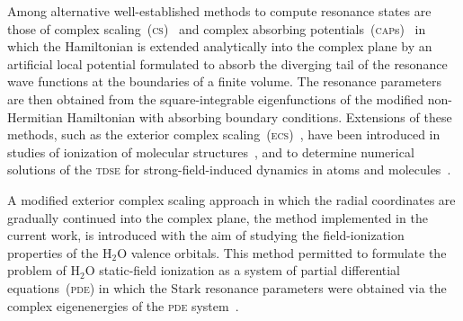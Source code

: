 Among alternative well-established methods to compute resonance states
are those of complex scaling~(\textsc{cs})~\cite{complexScalingSimon}
and complex absorbing potentials~(\textsc{cap}s)~\cite{RissMeyer_1993}
in which the Hamiltonian is extended analytically into the complex
plane by an artificial local potential formulated to absorb the
diverging tail of the resonance wave functions at the boundaries of a
finite volume. The resonance parameters are then obtained from the
square-integrable eigenfunctions of the modified non-Hermitian
Hamiltonian with absorbing boundary conditions. Extensions of these
methods, such as the exterior complex
scaling~(\textsc{ecs})~\cite{Simon_1979}, have been introduced in
studies of ionization of molecular
structures~\cite{ScrinziJChemPhys_ECS,ScrinziJPhysB_ECS}, and to
determine numerical solutions of the \textsc{tdse} for
strong-field-induced dynamics in atoms and
molecules~\cite{Krause_2014,ecsScrinzi,ecsRuiz}.


A modified exterior complex scaling approach in which the radial
coordinates are gradually continued into the complex plane, the method
implemented in the current work, is introduced with the aim of
studying the field-ionization properties of the H$_{2}$O valence
orbitals. This method permitted to formulate the problem of H$_{2}$O
static-field ionization as a system of partial differential
equations~(\textsc{pde}) in which the Stark resonance parameters were
obtained via the complex eigenenergies of the \textsc{pde}
system~\cite{sarias_2016,sarias_2017}.



